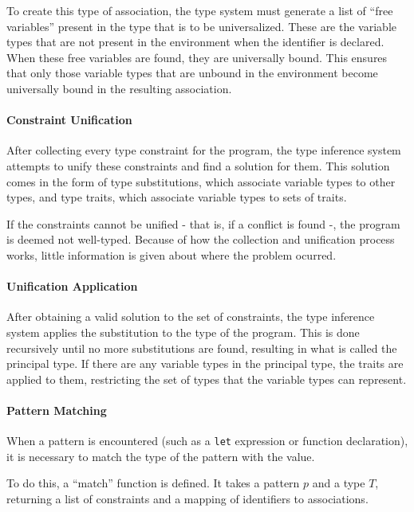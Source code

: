 \documentclass{article}
\begin{document}
To create this type of association, the type system must generate a list of ``free variables'' present in the type that is to be universalized.
These are the variable types that are not present in the environment when the identifier is declared.
When these free variables are found, they are universally bound.
This ensures that only those variable types that are unbound in the environment become universally bound in the resulting association.

\paragraph{Constraint Unification}

After collecting every type constraint for the program, the type inference system attempts to unify these constraints and find a solution for them.
This solution comes in the form of type substitutions, which associate variable types to other types, and type traits, which associate variable types to sets of traits.

If the constraints cannot be unified - that is, if a conflict is found -, the program is deemed not well-typed.
Because of how the collection and unification process works, little information is given about where the problem ocurred.

\paragraph{Unification Application}

After obtaining a valid solution to the set of constraints, the type inference system applies the substitution to the type of the program.
This is done recursively until no more substitutions are found, resulting in what is called the principal type.
If there are any variable types in the principal type, the traits are applied to them, restricting the set of types that the variable types can represent.

\paragraph{Pattern Matching}

When a pattern is encountered (such as a \texttt{let} expression or function declaration), it is necessary to match the type of the pattern with the value.

To do this, a ``match'' function is defined.
It takes a pattern $p$ and a type $T$, returning a list of constraints and a mapping of identifiers to associations.
\end{document}
